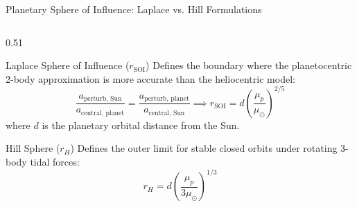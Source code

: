 \documentclass[aspectratio=169, 10pt]{beamer}
\begin{document}
\begin{frame}{Planetary Sphere of Influence: Laplace vs. Hill Formulations}
    \begin{columns}[t]
        \begin{column}{0.51\textwidth}
            \begin{block}{Laplace Sphere of Influence ($r_{\text{SOI}}$)}
                \scriptsize
                Defines the boundary where the planetocentric 2-body approximation is more accurate than the heliocentric model:
                \vspace{-0.1cm}
                \begin{equation*}
                    \frac{a_{\text{perturb, Sun}}}{a_{\text{central, planet}}} = \frac{a_{\text{perturb, planet}}}{a_{\text{central, Sun}}} \implies r_{\text{SOI}} = d \left(\frac{\mu_p}{\mu_\odot}\right)^{2/5}
                \end{equation*}
                \vspace{-0.1cm}
                where $d$ is the planetary orbital distance from the Sun.
            \end{block}

            \vspace{-0.1cm}

            \begin{block}{Hill Sphere ($r_H$)}
                \scriptsize
                Defines the outer limit for stable closed orbits under rotating 3-body tidal forces:
                \vspace{-0.1cm}
                \begin{equation*}
                    r_H = d \left(\frac{\mu_p}{3\mu_\odot}\right)^{1/3}
                \end{equation*}
            \end{block}
        \end{column}


\end{columns}
\end{frame}
\end{document}
